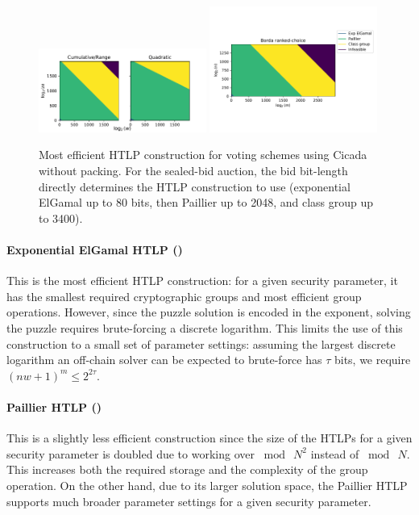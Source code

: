 \begin{figure}[tb!]
    \centering
    \includegraphics[width=0.49\textwidth,trim={0cm -0.5cm 0cm 0cm}]{cicada/figs/params/nopack_crq.pdf}
    \includegraphics[width=0.49\textwidth,trim={2cm 2cm 0cm 2cm},clip]{cicada/figs/params/nopack_borda.pdf}
    \caption{Most efficient HTLP construction for voting schemes using Cicada without packing. For the sealed-bid auction, the bid bit-length directly determines the HTLP construction to use (exponential ElGamal up to 80 bits, then Paillier up to 2048, and class group up to 3400).}
    \label{fig:nopack_feasibility}
\end{figure}

\paragraph{Exponential ElGamal HTLP ()} 
This is the most efficient HTLP construction: for a given security parameter, it has the smallest required cryptographic groups and most efficient group operations. However, since the puzzle solution is encoded in the exponent, solving the puzzle requires brute-forcing a discrete logarithm. This limits the use of this construction to a small set of parameter settings: assuming the largest discrete logarithm an off-chain solver can be expected to brute-force has $\tau$ bits, we require $(nw+1)^m \leq 2^{2\tau}$.

\paragraph{Paillier HTLP ()} 
This is a slightly less efficient construction since the size of the HTLPs for a given security parameter is doubled due to working over $\bmod~N^2$ instead of $\bmod~N$. This increases both the required storage and the complexity of the group operation. On the other hand, due to its larger solution space, the Paillier HTLP supports much broader parameter settings for a given security parameter.

